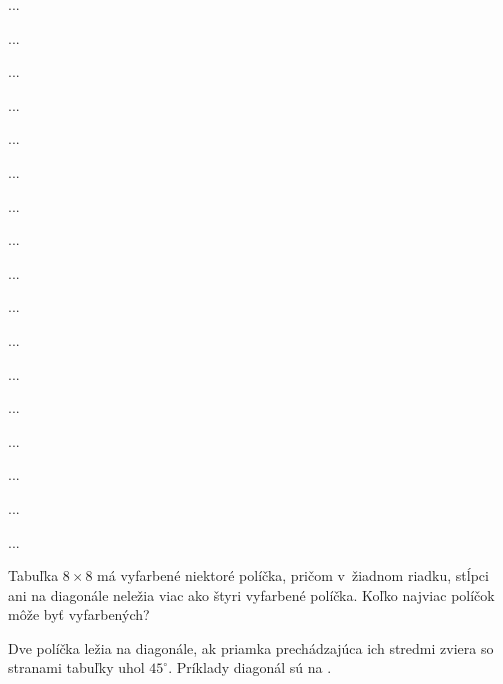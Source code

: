 {%
}
\podpis{}

{%
}
\podpis{}

{%
}
\podpis{}

{%
}
\podpis{}

{%
}
\podpis{}

{%
}
\podpis{}

{%
}
\podpis{}

{%
}
\podpis{}

{%
}
\podpis{}

{%
}
\podpis{}

{%
}
\podpis{}

{%
}
\podpis{}

{%
...}

{%
...}

{%
...}

{%
...}

{%
...}

{%
...}

{%
...}

{%
...}

{%
...}

{%
...}

{%
...}

{%
...}

{%
...}

{%
...}

{%
...}

{%
...}

{%
...}

{%
Tabuľka $8 \times 8$ má vyfarbené niektoré políčka, pričom v~žiadnom riadku, stĺpci ani na diagonále neležia viac ako štyri vyfarbené políčka. Koľko najviac políčok môže byť vyfarbených?

\poznamka
Dve políčka ležia na diagonále, ak priamka prechádzajúca ich stredmi zviera so stranami tabuľky uhol $45^\circ$. Príklady diagonál sú na \obr.
%
}


